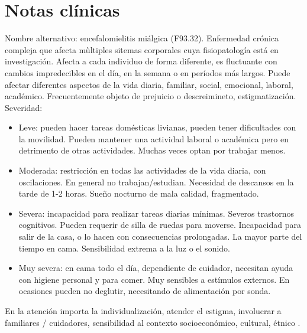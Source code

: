 \documentclass{scrbook}
\begin{document}
\section*{Notas clínicas}
Nombre alternativo: encefalomielitis miálgica (F93.32).
Enfermedad crónica compleja que afecta mùltiples sitemas corporales cuya fisiopatología está en investigación. Afecta a cada individuo de forma diferente, es fluctuante con cambios impredecibles en el día, en la semana o en períodos más largos. Puede afectar diferentes aspectos de la vida diaria, familiar, social, emocional, laboral, académico.
Frecuentemente objeto de prejuicio o descreimineto, estigmatización.
Severidad:
\begin{itemize}
	\item Leve: pueden hacer tareas domésticas livianas, pueden tener dificultades con la movilidad. Pueden mantener una actividad laboral o académica pero en detrimento de otras actividades. Muchas veces optan por trabajar menos.
	\item Moderada: restricción en todas las actividades de la vida diaria, con oscilaciones. En general no trabajan/estudian. Necesidad de descansos en la tarde de 1-2 horas. Sueño nocturno de mala calidad, fragmentado.
	\item Severa: incapacidad para realizar tareas diarias mínimas. Severos trastornos cognitivos. Pueden requerir de silla de ruedas para moverse. Incapacidad para salir de la casa, o lo hacen con consecuencias prolongadas. La mayor parte del tiempo en cama. Sensibilidad extrema a la luz o el sonido.
	\item Muy severa: en cama todo el día, dependiente de cuidador, necesitan ayuda con higiene personal y para comer. Muy sensibles a estímulos externos. En ocasiones pueden no deglutir, necesitando de alimentación por sonda.
\end{itemize}
En la atención importa la individualización, atender el estigma, involucrar a familiares / cuidadores, sensibilidad al contexto socioeconómico, cultural, étnico \cite{baker2007diagnosis}.
\end{document}
